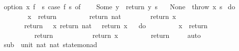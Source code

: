 \begin{isabellebody}
\ {\isachardoublequoteopen}option\ x\ f\ {\isacharequal}{\kern0pt}\ {\isacharparenleft}{\kern0pt}{\isasymlambda}s{\isachardot}{\kern0pt}\ {\isacharparenleft}{\kern0pt}case\ f\ s\ of\isanewline
\ \ \ \ Some\ y\ {\isasymRightarrow}\ return\ y\ s\isanewline
\ \ {\isacharbar}{\kern0pt}\ None\ {\isasymRightarrow}\ throw\ x\ s{\isacharparenright}{\kern0pt}{\isacharparenright}{\kern0pt}{\isachardoublequoteclose}%
\isadelimdocument
%
\endisadelimdocument
%
\isatagdocument
%
\isamarkuptrue%
%
\endisatagdocument
{\isafolddocument}%
%
\isadelimdocument
%
\endisadelimdocument
{}\isamarkupfalse%
\ {\isachardoublequoteopen}do\ {\isacharbraceleft}{\kern0pt}\isanewline
\ \ \ \ \ \ \ \ x\ {\isasymleftarrow}\ return\ {}{\isacharsemicolon}{\kern0pt}\isanewline
\ \ \ \ \ \ \ \ return\ {\isacharparenleft}{\kern0pt}{}{\isacharcolon}{\kern0pt}{\isacharcolon}{\kern0pt}nat{\isacharparenright}{\kern0pt}{\isacharsemicolon}{\kern0pt}\isanewline
\ \ \ \ \ \ \ \ return\ x\isanewline
\ \ \ \ \ \ \ {\isacharbraceright}{\kern0pt}\ {\isacharequal}{\kern0pt}\isanewline
\ \ \ \ \ \ \ return\ {}\ {\isasymbind}\ {\isacharparenleft}{\kern0pt}{\isasymlambda}x{\isachardot}{\kern0pt}\ return\ {\isacharparenleft}{\kern0pt}{}{\isacharcolon}{\kern0pt}{\isacharcolon}{\kern0pt}nat{\isacharparenright}{\kern0pt}\ {\isasymbind}\ {\isacharparenleft}{\kern0pt}{\isasymlambda}{\isacharunderscore}{\kern0pt}{\isachardot}{\kern0pt}\ {\isacharparenleft}{\kern0pt}return\ x{\isacharparenright}{\kern0pt}{\isacharparenright}{\kern0pt}{\isacharparenright}{\kern0pt}{\isachardoublequoteclose}%
\isadelimproof
\ %
\endisadelimproof
%
\isatagproof
\isacommand{{\isachardot}{\kern0pt}{\isachardot}{\kern0pt}}\isamarkupfalse%
%
\endisatagproof
{\isafoldproof}%
%
\isadelimproof
%
\endisadelimproof
\isanewline
\isanewline
{}\isamarkupfalse%
\ {\isachardoublequoteopen}do\ {\isacharbraceleft}{\kern0pt}\isanewline
\ \ \ \ \ \ \ \ x\ {\isasymleftarrow}\ return\ {}{\isacharsemicolon}{\kern0pt}\isanewline
\ \ \ \ \ \ \ \ \ \ return\ {}{\isacharsemicolon}{\kern0pt}\isanewline
\ \ \ \ \ \ \ \ \ \ return\ x\isanewline
\ \ \ \ \ \ \ {\isacharbraceright}{\kern0pt}\ {\isacharequal}{\kern0pt}\ return\ {}{\isachardoublequoteclose}\isanewline
%
\isadelimproof
\ \ %
\endisadelimproof
%
\isatagproof
{}\isamarkupfalse%
\ auto%
\endisatagproof
{\isafoldproof}%
%
\isadelimproof
\isanewline
%
\endisadelimproof
\isanewline
{}\isamarkupfalse%
\ sub{}\ {\isacharcolon}{\kern0pt}{\isacharcolon}{\kern0pt}\ {\isachardoublequoteopen}{\isacharparenleft}{\kern0pt}unit{\isacharcomma}{\kern0pt}\ nat{\isacharcomma}{\kern0pt}\ nat{\isacharparenright}{\kern0pt}\ state{\isacharunderscore}{\kern0pt}monad{\isachardoublequoteclose}\ \isanewline

\end{isabellebody}
